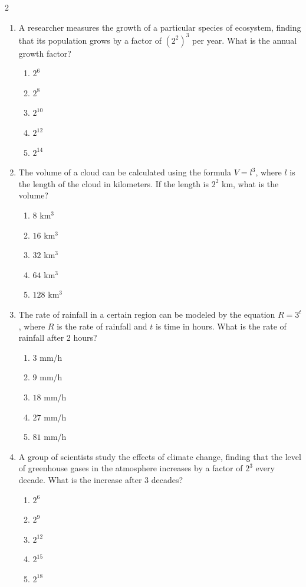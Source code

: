 \documentclass[10pt]{article}
\begin{document}
\begin{multicols}{2}
\begin{enumerate}[label=\textbf{Q\arabic*.}, leftmargin=*, itemsep=6pt, parsep=0pt]
  \item \small A researcher measures the growth of a particular species of ecosystem, finding that its population grows by a factor of $(2^2)^3$ per year. What is the annual growth factor?
  \begin{enumerate}[label=(\Alph*), leftmargin=0.6cm, nosep, itemsep=2pt]
    \item $2^6$
    \item $2^8$
    \item $2^{10}$
    \item $2^{12}$
    \item $2^{14}$
  \end{enumerate}

  \item \small The volume of a cloud can be calculated using the formula $V = l^3$, where $l$ is the length of the cloud in kilometers. If the length is $2^2$ km, what is the volume?
  \begin{enumerate}[label=(\Alph*), leftmargin=0.6cm, nosep, itemsep=2pt]
    \item $8$ km$^3$
    \item $16$ km$^3$
    \item $32$ km$^3$
    \item $64$ km$^3$
    \item $128$ km$^3$
  \end{enumerate}

  \item \small The rate of rainfall in a certain region can be modeled by the equation $R = 3^t$, where $R$ is the rate of rainfall and $t$ is time in hours. What is the rate of rainfall after 2 hours?
  \begin{enumerate}[label=(\Alph*), leftmargin=0.6cm, nosep, itemsep=2pt]
    \item $3$ mm/h
    \item $9$ mm/h
    \item $18$ mm/h
    \item $27$ mm/h
    \item $81$ mm/h
  \end{enumerate}

  \item \small A group of scientists study the effects of climate change, finding that the level of greenhouse gases in the atmosphere increases by a factor of $2^3$ every decade. What is the increase after 3 decades?
  \begin{enumerate}[label=(\Alph*), leftmargin=0.6cm, nosep, itemsep=2pt]
    \item $2^6$
    \item $2^9$
    \item $2^{12}$
    \item $2^{15}$
    \item $2^{18}$
  \end{enumerate}


\end{enumerate}
\end{multicols}
\end{document}
